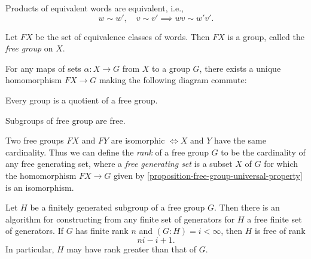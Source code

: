 \begin{proposition}
  \label{proposition-product-equivalent-words}
  Products of equivalent words are equivalent, i.e.,
  \[
    w \sim w',\quad v \sim v' \implies wv \sim w'v'.
  \]
\end{proposition}

\begin{definition}
  \label{definition-free-group}
  Let \( FX \) be the set of equivalence classes of words.
  Then \( FX \) is a group, called the \emph{free group} on \( X \).
\end{definition}

\begin{proposition}
  \label{proposition-free-group-universal-property}
  For any maps of sets \( \alpha: X \to G \) from \( X \) to a group \( G \), there exists a unique homomorphism \( FX \to G \) making the following diagram commute:
  \begin{center}
  \end{center}
\end{proposition}

\begin{corollary}
  \label{corollary-any-group-is-a-quotient}
  Every group is a quotient of a free group.
\end{corollary}


\begin{theorem}
  \label{theorem-Nielsen-Schreier}
  Subgroups of free group are free.
\end{theorem}

Two free groups \( FX \) and \( FY \) are isomorphic \( \iff X \) and \( Y \) have the same cardinality.
Thus we can define the \emph{rank} of a free group \( G \) to be the cardinality of any free generating set, where a \emph{free generating set} is a subset \( X \) of \( G \) for which the homomorphism \( FX \to G \) given by \ref{proposition-free-group-universal-property} is an isomorphism.

Let \( H \) be a finitely generated subgroup of a free group \( G \).
Then there is an algorithm for constructing from any finite set of generators for \( H \) a free finite set of generators.
If \( G \) has finite rank \( n \) and \( (G: H) = i < \infty \), then \( H \) is free of rank
\[
  ni - i + 1.
\]
In particular, \( H \) may have rank greater than that of \( G \).

